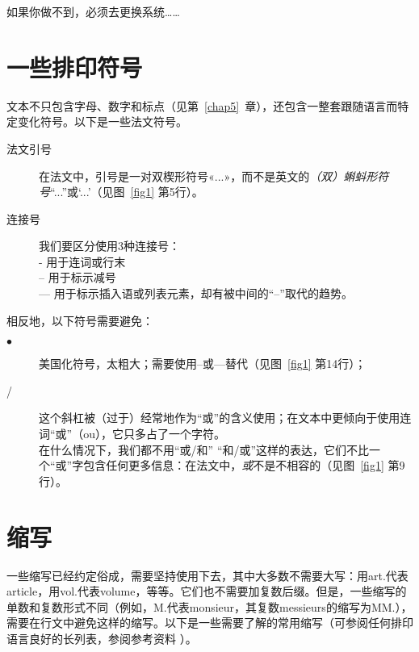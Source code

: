 如果你做不到，必须去更换系统……

\section{一些排印符号}\label{sec2.2}

文本不只包含字母、数字和标点（见第~\ref{chap5}~章），还包含一整套跟随语言而特定变化符号。以下是一些法文符号。

\begin{description}
    \item[法文引号] 在法文中，引号是一对双楔形符号«...»，而不是英文的\emph{（双）蝌蚪形符号}``...''或`...'（见图~\ref{fig1} 第5行）。
    \item[连接号] 我们要区分使用3种连接号：\\
    - 用于连词或行末\\
    -- 用于标示减号\\
    --- 用于标示插入语或列表元素，却有被中间的``--''取代的趋势。
\end{description}

相反地，以下符号需要避免：

\begin{description}
    \item[$\bullet$] 美国化符号，太粗大；需要使用--或---替代（见图~\ref{fig1} 第14行）；
    \item[/] 这个斜杠被（过于）经常地作为``或''的含义使用；在文本中更倾向于使用连词``或''（ou），它只多占了一个字符。\\
    在什么情况下，我们都不用``或/和'' ``和/或''这样的表达，它们不比一个``或''字包含任何更多信息：在法文中，\emph{或}不是不相容的（见图~\ref{fig1} 第9行）。
\end{description}

\section{缩写}\label{sec2.3}

一些缩写已经约定俗成，需要坚持使用下去，其中大多数不需要大写：用art.代表article，用vol.代表volume，等等。它们也不需要加复数后缀。但是，一些缩写的单数和复数形式不同（例如，M.代表monsieur，其复数messieurs的缩写为MM.），需要在行文中避免这样的缩写。以下是一些需要了解的常用缩写（可参阅任何排印语言良好的长列表，参阅参考资料%
）。

